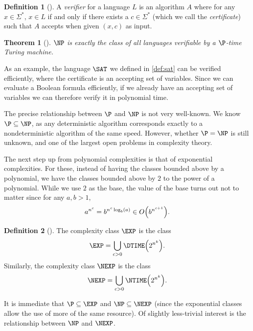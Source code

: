 \documentclass[english,12pt]{reedthesis}
\theoremstyle{plain}
\newtheorem{thm}{Theorem}[section]
\theoremstyle{definition}
\newtheorem{defn}[defn]{Definition}
\theoremstyle{remark}
\begin{document}
\begin{defn}[{\cite[Def.\ 7.18]{Sip97}}]%
  \label{def:verifier}
  A \emph{verifier} for a language $L$ is an algorithm $A$ where for any
  $x \in \Sigma^{*}$, $x \in L$ if and only if there exists a $c \in \Sigma^{*}$ (which we call
  the \emph{certificate}) such that $A$ accepts when given $(x, c)$ as input.
\end{defn}

\begin{thm}[{\cite[Def.\ 7.19]{Sip97}}]\label{thm:np-verifier}
  $\NP$ is exactly the class of all languages verifiable by a $\P$-time Turing
  machine.
\end{thm}

As an example, the language $\SAT$ we defined in \cref{def:sat} can be verified
efficiently, where the certificate is an accepting set of variables. Since we
can evaluate a Boolean formula efficiently, if we already have an accepting set
of variables we can therefore verify it in polynomial time.

The precise relationship between $\P$ and $\NP$ is not very well-known. We know
$\P \subseteq \NP$, as any deterministic algorithm corresponds exactly to a
nondeterministic algorithm of the same speed. However, whether $\P = \NP$ is
still unknown, and one of the largest open problems in complexity theory.

The next step up from polynomial complexities is that of exponential
complexities. For these, instead of having the classes bounded above by a
polynomial, we have the classes bounded above by $2$ to the power of a
polynomial. While we use $2$ as the base, the value of the base turns out not to
matter since for any $a, b > 1$,
\begin{equation}
  a^{n^{c}} = b^{n^{c}\log_{b}(a)} \in O\mleft(b^{n^{c+1}}\mright).
\end{equation}

\begin{defn}[{\cite[.2]{AB09}}]%
  \label{def:exp-nexp}
  The complexity class $\EXP$ is the class
  \[
    \EXP = \bigcup_{c > 0}\DTIME\mleft(2^{n^{k}}\mright).
  \]
  Similarly, the complexity class $\NEXP$ is the class
  \[
    \NEXP = \bigcup_{c > 0}\NTIME\mleft(2^{n^{k}}\mright).
  \]
\end{defn}

It is immediate that $\P \subseteq \EXP$ and $\NP \subseteq \NEXP$ (since the exponential
classes allow the use of more of the same resource). Of slightly less-trivial
interest is the relationship between $\NP$ and $\NEXP$.
\end{document}
